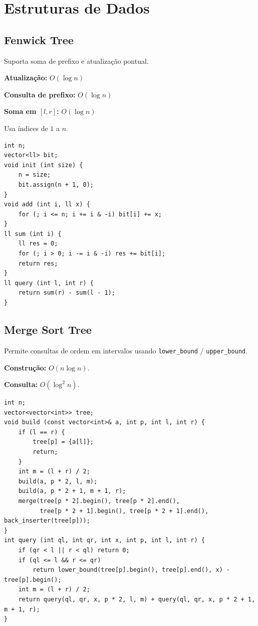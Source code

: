 \section{Estruturas de Dados}

\subsection{Fenwick Tree}

Suporta soma de prefixo e atualização pontual.

\textbf{Atualização:} $O(\log n)$

\textbf{Consulta de prefixo:} $O(\log n)$

\textbf{Soma em $[l,r]$:} $O(\log n)$

Usa índices de $1$ a $n$.

\begin{lstlisting}
int n;
vector<ll> bit;
void init (int size) {
    n = size;
    bit.assign(n + 1, 0);
}
void add (int i, ll x) {
    for (; i <= n; i += i & -i) bit[i] += x;
}
ll sum (int i) {
    ll res = 0;
    for (; i > 0; i -= i & -i) res += bit[i];
    return res;
}
ll query (int l, int r) {
    return sum(r) - sum(l - 1);
}
\end{lstlisting}


\subsection{Merge Sort Tree}

Permite consultas de ordem em intervalos usando
\texttt{lower\_bound} / \texttt{upper\_bound}.

\textbf{Construção:} $O(n\log n)$.

\textbf{Consulta:} $O(\log^2 n)$.

\begin{lstlisting}
int n;
vector<vector<int>> tree;
void build (const vector<int>& a, int p, int l, int r) {
    if (l == r) {
        tree[p] = {a[l]};
        return;
    }
    int m = (l + r) / 2;
    build(a, p * 2, l, m);
    build(a, p * 2 + 1, m + 1, r);
    merge(tree[p * 2].begin(), tree[p * 2].end(), 
          tree[p * 2 + 1].begin(), tree[p * 2 + 1].end(), back_inserter(tree[p]));
}
int query (int ql, int qr, int x, int p, int l, int r) {
    if (qr < l || r < ql) return 0;
    if (ql <= l && r <= qr)
        return lower_bound(tree[p].begin(), tree[p].end(), x) - tree[p].begin();
    int m = (l + r) / 2;
    return query(ql, qr, x, p * 2, l, m) + query(ql, qr, x, p * 2 + 1, m + 1, r);
}
\end{lstlisting}

